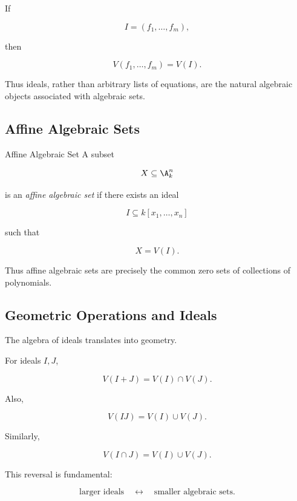 If

\[
I=(f_1,\ldots,f_m),
\]

then

\[
\boxed{
V(f_1,\ldots,f_m)=V(I).
}
\]

Thus ideals, rather than arbitrary lists of equations, are the natural
algebraic objects associated with algebraic sets.

\subsection{Affine Algebraic Sets}
\label{subsec:affine-algebraic-sets}

\begin{definitionbox}{Affine Algebraic Set}
A subset

\[
X\subseteq\A^n_k
\]

is an \emph{affine algebraic set} if there exists an ideal

\[
I\subseteq k[x_1,\ldots,x_n]
\]

such that

\[
\boxed{
X=V(I).
}
\]
\end{definitionbox}

Thus affine algebraic sets are precisely the common zero sets of collections
of polynomials.

\subsection{Geometric Operations and Ideals}
\label{subsec:geometric-operations-ideals}

The algebra of ideals translates into geometry.

For ideals \(I,J\),

\[
\boxed{
V(I+J)=V(I)\cap V(J).
}
\]

Also,

\[
\boxed{
V(IJ)=V(I)\cup V(J).
}
\]

Similarly,

\[
\boxed{
V(I\cap J)=V(I)\cup V(J).
}
\]

This reversal is fundamental:

\[
\boxed{
\text{larger ideals}
\quad\longleftrightarrow\quad
\text{smaller algebraic sets}.
}
\]

